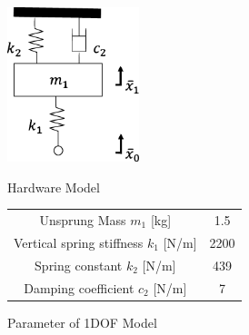 \documentclass[a4paper,12pt]{article_vdlab_sotsuron}
\begin{document}
\vspace{10mm}
\begin{figure}[h]
  \begin{minipage}{0.4\hsize}
     \begin{center}
      \includegraphics[height=45mm]{figure/hardware_model.eps}
	\vspace{2mm}
      \caption{Hardware Model}
      \label{fig:hardware_model}
    \end{center}
  \end{minipage}
\begin{minipage}{0.6\hsize}
\makeatletter
\def\@captype{table}
\makeatother
  \begin{center}
   \caption{Parameter of 1DOF Model}
   \label{tab:parameter_1dof}
   \begin{tabular}{cc}\hline
      Unsprung Mass $m_1$ [kg] & 1.5  \\
      Vertical spring stiffness $k_1$ [N/m] & 2200  \\
      Spring constant $k_2$ [N/m] & 439   \\
      Damping coefficient $c_2$ [N/m] & 7   \\ \hline
    \end{tabular}
   \end{center}
 \end{minipage}
\end{figure}
\end{document}
